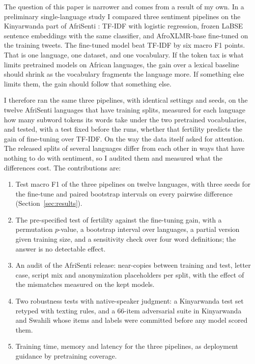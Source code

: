 \documentclass[11pt]{article}
\begin{document}
The question of this paper is narrower and comes from a result of my own. In a preliminary single-language study I compared three sentiment pipelines on the Kinyarwanda part of AfriSenti \citep{muhammad2023afrisenti}: TF-IDF with logistic regression, frozen LaBSE sentence embeddings \citep{feng2022labse} with the same classifier, and AfroXLMR-base \citep{alabi2022adapting} fine-tuned on the training tweets. The fine-tuned model beat TF-IDF by six macro F1 points. That is one language, one dataset, and one vocabulary. If the token tax is what limits pretrained models on African languages, the gain over a lexical baseline should shrink as the vocabulary fragments the language more. If something else limits them, the gain should follow that something else.

I therefore ran the same three pipelines, with identical settings and seeds, on the twelve AfriSenti languages that have training splits, measured for each language how many subword tokens its words take under the two pretrained vocabularies, and tested, with a test fixed before the runs, whether that fertility predicts the gain of fine-tuning over TF-IDF. On the way the data itself asked for attention. The released splits of several languages differ from each other in ways that have nothing to do with sentiment, so I audited them and measured what the differences cost. The contributions are:
\begin{enumerate}
\item Test macro F1 of the three pipelines on twelve languages, with three seeds for the fine-tune and paired bootstrap intervals on every pairwise difference (Section~\ref{sec:results}).
\item The pre-specified test of fertility against the fine-tuning gain, with a permutation $p$-value, a bootstrap interval over languages, a partial version given training size, and a sensitivity check over four word definitions; the answer is no detectable effect.
\item An audit of the AfriSenti release: near-copies between training and test, letter case, script mix and anonymization placeholders per split, with the effect of the mismatches measured on the kept models.
\item Two robustness tests with native-speaker judgment: a Kinyarwanda test set retyped with texting rules, and a 66-item adversarial suite in Kinyarwanda and Swahili whose items and labels were committed before any model scored them.
\item Training time, memory and latency for the three pipelines, as deployment guidance by pretraining coverage.
\end{enumerate}
\end{document}
